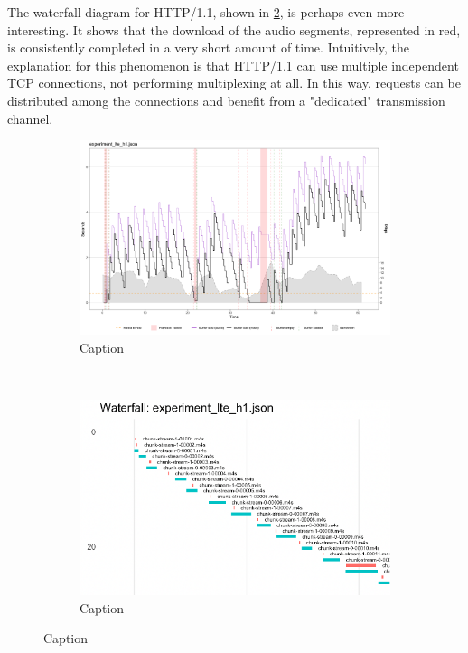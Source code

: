 The waterfall diagram for HTTP/1.1, shown in \ref{fig:eval_nonabr_lte_h1_waterfall}, is perhaps even more interesting. It shows that the download of the audio segments, represented in red, is consistently completed in a very short amount of time. Intuitively, the explanation for this phenomenon is that HTTP/1.1 can use multiple independent TCP connections, not performing multiplexing at all. In this way, requests can be distributed among the connections and benefit from a "dedicated" transmission channel.

\begin{figure}[h]
	\centering
	
	\begin{subfigure}[t]{0.45\textwidth}
		\centering
		\includegraphics[width=\textwidth]{res/eval_nonabr_lte_h1.png}
		\caption{Caption}
		\label{fig:eval_nonabr_lte_h1_buffer}
	\end{subfigure}%
	~ 
	\begin{subfigure}[t]{0.45\textwidth}
		\centering
		\includegraphics[width=\textwidth]{res/eval_nonabr_lte_h1_waterfall.png}
		\caption{Caption}
		\label{fig:eval_nonabr_lte_h1_waterfall}
	\end{subfigure}
	
	\caption{Caption}
	\label{fig:eval_nonabr_lte_h1}
\end{figure}

